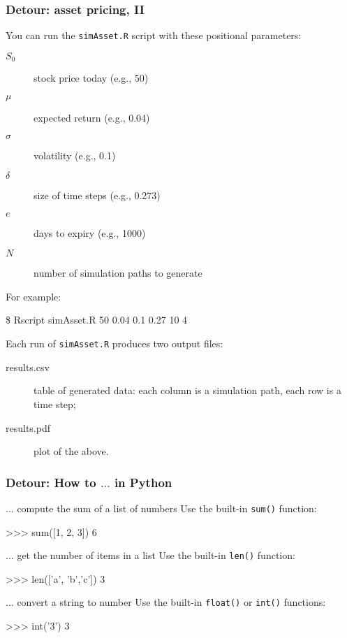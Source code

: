 \documentclass[english,serif,mathserif,xcolor=pdftex,dvipsnames,table]{beamer}
\begin{document}
\begin{frame}[fragile]
  \frametitle{Detour: asset pricing, II}
  \small
  You can run the \texttt{simAsset.R} script with these positional parameters:
  \begin{description}
  \item[$S_0$] stock price today (e.g., 50)
  \item[$\mu$] expected return (e.g., 0.04)
  \item[$\sigma$] volatility (e.g., 0.1)
  \item[$\delta$] size of time steps (e.g., 0.273)
  \item[$e$] days to expiry (e.g., 1000)
  \item[$N$] number of simulation paths to generate
  \end{description}

  For example:
\begin{semiverbatim}
  \$ Rscript simAsset.R 50 0.04 0.1 0.27 10 4
\end{semiverbatim}
  
  \+ Each run of \texttt{simAsset.R} produces two output files:
  \begin{description}
  \item[results.csv] table of generated data: each column is a simulation path, each row is a time step;
  \item[results.pdf] plot of the above.
  \end{description}
\end{frame}


\begin{frame}[fragile]
  \frametitle{Detour: How to $\ldots$ in Python}
  \small{}

  \begin{describe}{$\ldots$ compute the sum of a list of numbers}
    Use the built-in \lstinline|sum()| function:
    \begin{python}
>>> sum([1, 2, 3])
6
    \end{python}
  \end{describe}

  \begin{describe}{$\ldots$ get the number of items in a list}
    Use the built-in \lstinline|len()| function:
    \begin{python}
>>> len(['a', 'b','c'])
3
    \end{python}
  \end{describe}

  \begin{describe}{$\ldots$ convert a string to number}
    Use the built-in \lstinline|float()| or \lstinline|int()| functions:
    \begin{python}
>>> int('3')
3
    \end{python}
  \end{describe}
\end{frame}
\end{document}
